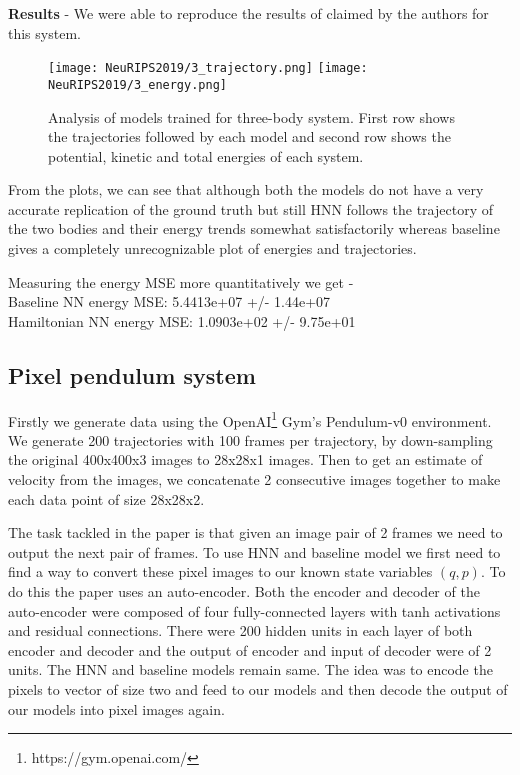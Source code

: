 \documentclass{article}
\begin{document}
\textbf{Results} - We were able to reproduce the results of claimed by the authors for this system.
\begin{figure}[htp]
    \centering
    \texttt{[image: NeuRIPS2019/3\_trajectory.png]}
    \texttt{[image: NeuRIPS2019/3\_energy.png]}
    \caption{Analysis of models trained for three-body system. First row shows the trajectories followed by each model and second row shows the potential, kinetic and total energies of each system.}
    \label{fig:galaxy}
\end{figure}

From the plots, we can see that although both the models do not have a very accurate replication of the ground truth but still HNN follows the trajectory of the two bodies and their energy trends somewhat satisfactorily whereas baseline gives a completely unrecognizable plot of energies and trajectories.

Measuring the energy MSE more quantitatively we get -\\
Baseline NN energy MSE: 5.4413e+07 +/- 1.44e+07\\
Hamiltonian NN energy MSE: 1.0903e+02 +/- 9.75e+01

\subsection{Pixel pendulum system}
Firstly we generate data using the OpenAI\footnote{https://gym.openai.com/} Gym's Pendulum-v0 environment. We generate 200 trajectories with 100 frames per trajectory, by down-sampling the original 400x400x3 images to 28x28x1 images. Then to get an estimate of velocity from the images, we concatenate 2 consecutive images together to make each data point of size 28x28x2. 

The task tackled in the paper is that given an image pair of 2 frames we need to output the next pair of frames. To use HNN and baseline model we first need to find a way to convert these pixel images to our known state variables \((q, p)\). To do this the paper uses an auto-encoder. Both the encoder and decoder of the auto-encoder were composed of four fully-connected layers with tanh activations and residual connections. There were 200 hidden units in each layer of both encoder and decoder and the output of encoder and input of decoder were of 2 units. The HNN and baseline models remain same. The idea was to encode the pixels to vector of size two and feed to our models and then decode the output of our models into pixel images again.
\end{document}
